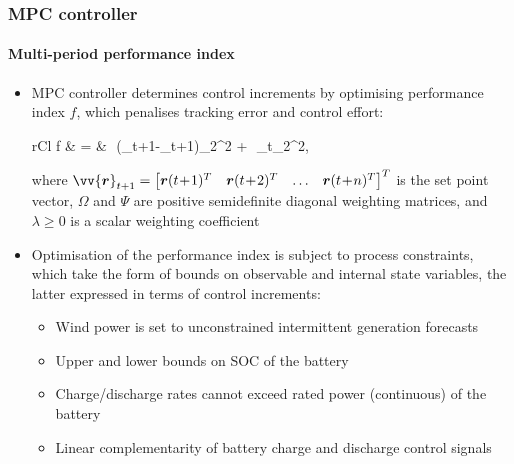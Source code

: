 \documentclass[presentation, smaller, table, svgnames]{beamer}
\newcommand{\sqrts}[2][]{\,\sqrt[#1]{#2}\,}
\begin{document}
\begin{frame}
	\frametitle{MPC controller}
	\framesubtitle{Multi-period performance index}
	

	\begin{itemize}
		\item  MPC controller determines control increments by optimising performance index $f$, which penalises tracking error and control effort:
		\begin{IEEEeqnarray*}{rCl}
			f & = & \left\lVert\sqrts{\Omega}\left(_{t+1}-_{t+1}\right)\right\rVert_{2}^{2} + \lambda\left\lVert\sqrts{\Psi}_{t}\right\rVert_{2}^{2},
		\end{IEEEeqnarray*}
		where $\vv{\boldsymbol{r}}_{t+1} = \begin{bmatrix*}[c] \boldsymbol{r}(t\!+\!1)^{T} & \boldsymbol{r}(t\!+\!2)^{T} & \ldots & \boldsymbol{r}(t\!+\!n)^{T} \end{bmatrix*}^{T}$ is the set point vector, $\Omega$ and $\Psi$ are positive semidefinite diagonal weighting matrices, and $\lambda \geq 0$ is a scalar weighting coefficient
		
		\item  Optimisation of the performance index is subject to process constraints, which take the form of bounds on observable and internal state variables, the latter expressed in terms of control increments:
		\begin{itemize}
			\item  Wind power is set to unconstrained intermittent generation forecasts
			\item  Upper and lower bounds on SOC of the battery
			\item  Charge/discharge rates cannot exceed rated power (continuous) of the battery
			\item  Linear complementarity of battery charge and discharge control signals
		\end{itemize}


\end{itemize}
\end{frame}
\end{document}
